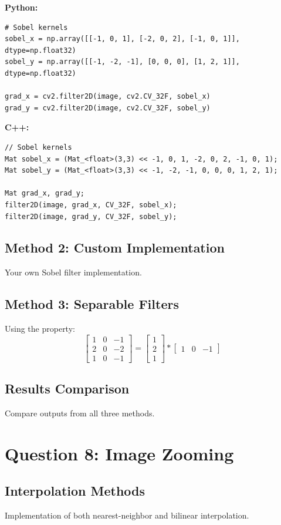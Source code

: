 \documentclass[11pt]{article}
\begin{document}
\textbf{Python:}
\begin{lstlisting}[style=pythonstyle]
# Sobel kernels
sobel_x = np.array([[-1, 0, 1], [-2, 0, 2], [-1, 0, 1]], dtype=np.float32)
sobel_y = np.array([[-1, -2, -1], [0, 0, 0], [1, 2, 1]], dtype=np.float32)

grad_x = cv2.filter2D(image, cv2.CV_32F, sobel_x)
grad_y = cv2.filter2D(image, cv2.CV_32F, sobel_y)
\end{lstlisting}

\textbf{C++:}
\begin{lstlisting}[style=cppstyle]
// Sobel kernels
Mat sobel_x = (Mat_<float>(3,3) << -1, 0, 1, -2, 0, 2, -1, 0, 1);
Mat sobel_y = (Mat_<float>(3,3) << -1, -2, -1, 0, 0, 0, 1, 2, 1);

Mat grad_x, grad_y;
filter2D(image, grad_x, CV_32F, sobel_x);
filter2D(image, grad_y, CV_32F, sobel_y);
\end{lstlisting}

\subsection{Method 2: Custom Implementation}
Your own Sobel filter implementation.

\subsection{Method 3: Separable Filters}
Using the property:
\[
\begin{bmatrix} 1 & 0 & -1 \\ 2 & 0 & -2 \\ 1 & 0 & -1 \end{bmatrix} 
= \begin{bmatrix} 1 \\ 2 \\ 1 \end{bmatrix} * \begin{bmatrix} 1 & 0 & -1 \end{bmatrix}
\]

\subsection{Results Comparison}
Compare outputs from all three methods.

\section{Question 8: Image Zooming}
\subsection{Interpolation Methods}
Implementation of both nearest-neighbor and bilinear interpolation.
\end{document}
